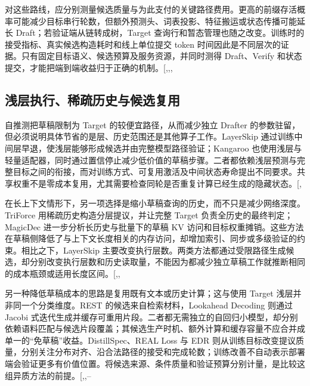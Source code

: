 \documentclass[
  a4paper,
  UTF8,
  fontset=none,
  zihao=5]{ctexart}
\begin{document}
对这些路线，应分别测量候选质量与为此支付的关键路径费用。更高的前缀存活概率可能减少目标串行轮数，但额外预测头、词表投影、特征搬运或状态传播可能延长
Draft；若验证端从链转成树，Target
查询行和暂态管理也随之改变。训练时的接受指标、真实候选构造耗时和线上单位提交
token
时间因此是不同层次的证据。只有固定目标语义、候选预算及服务资源，并同时测得
Draft、Verify
和状态提交，才能把端到端收益归于正确的机制。{[},,,\citeproc{ref-realloss}{35}{]}

\subsection{浅层执行、稀疏历史与候选复用}\label{self-speculation}

自推测把草稿限制为 Target 的较便宜路径，从而减少独立 Drafter
的参数驻留，但必须说明具体节省的是层、历史范围还是其他算子工作。LayerSkip
通过训练中间层早退，使浅层能够形成候选并由完整模型路径验证；Kangaroo
也使用浅层与轻量适配器，同时通过置信停止减少低价值的草稿步骤。二者都依赖浅层预测与完整目标之间的衔接，而对训练方式、可复用激活及中间状态寿命提出不同要求。共享权重不是零成本复用，尤其需要检查同轮是否重复计算已经生成的隐藏状态。{[},\citeproc{ref-kangaroo}{40}{]}

在长上下文情形下，另一项选择是缩小草稿查询的历史，而不只是减少网络深度。TriForce
用稀疏历史构造分层提议，并让完整 Target 负责全历史的最终判定；MagicDec
进一步分析长历史与批量下的草稿 KV
访问和目标权重摊销。这些方法在草稿侧降低了与上下文长度相关的内存访问，却增加索引、同步或多级验证的约束。相比之下，LayerSkip
主要改变执行层数。两类方法都通过受限路径生成候选，却分别改变执行层数和历史读取量，不能因为都减少独立草稿工作就推断相同的成本瓶颈或适用长度区间。{[},,\citeproc{ref-triforce}{41}{]}

另一种降低草稿成本的思路是复用既有文本或历史计算；这与使用 Target
浅层并非同一个分类维度。REST 的候选来自检索材料，Lookahead Decoding
则通过 Jacobi
式迭代生成并缓存可重用片段。二者都无需独立的自回归小模型，却分别依赖语料匹配与候选片段覆盖；其候选生产时机、额外计算和缓存容量不应合并成单一的``免草稿''收益。DistillSpec、REAL
Loss 与 EDR
则从训练目标改变提议质量，分别关注分布对齐、沿合法路径的接受和完成轮数；训练改善不自动表示部署端会验证更多有价值位置。将候选来源、条件质量和验证预算分别计量，是比较这组异质方法的前提。{[},,--\citeproc{ref-edr}{44}{]}
\end{document}
